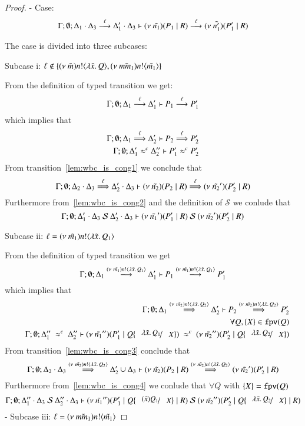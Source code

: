 \begin{proof}

	\noi - Case: 
	\[
		\horel{\Gamma}{\Delta_1 \cat \Delta_3}{\newsp{\tilde{n_1}}{P_1 \Par R}}{\by{\ell}}{\Delta_1' \cat \Delta_3}{\newsp{\tilde{n_1'}}{P_1' \Par R}}
	\]

	\noi The case is divided into three subcases:

	\noi Subcase i: $\ell \notin \set{\news{\tilde{m}} \bactout{n}{\abs{\tilde{x}}{Q}}, \news{\tilde{mm_1}} \bactout{n}{\tilde{m_1}}}$

	\noi From the definition of typed transition we get:
	\[
		\horel{\Gamma}{\Delta_1}{P_1}{\by{\ell}}{\Delta_1'}{P_1'}
	\]
	\noi which implies that
%
	\begin{eqnarray}
		\horel{\Gamma}{\Delta_1}{P_2}{\By{\ell}}{\Delta_2'}{P_2'}
		\label{lem:wbc_is_cong1}\\
		\horel{\Gamma}{\Delta_1'}{P_1'}{\wbc}{\Delta_2''}{P_2'}
		\label{lem:wbc_is_cong2}
	\end{eqnarray}
%
	\noi From transition~\ref{lem:wbc_is_cong1} we conclude that 
	\[
		\horel{\Gamma}{\Delta_2 \cat \Delta_3}{\newsp{\tilde{n_2}}{P_2 \Par R}}{\By{\ell}}{\Delta_2' \cat \Delta_3}{\newsp{\tilde{n_2}'}{P_2' \Par R}}
	\]
%
	\noi Furthermore from~\ref{lem:wbc_is_cong2} and the definition of $\mathcal{S}$ we conlude that
	\[
		\horel{\Gamma}{\Delta_1' \cat \Delta_3}{\newsp{\tilde{n_1}'}{P_1' \Par R}}{\ \mathcal{S}\ }{\Delta_2' \cat \Delta_3}{\newsp{\tilde{n_2}'}{P_2' \Par R}}
	\]

	\noi Subcase ii: $\ell = \news{\tilde{m_1}} \bactout{n}{\abs{\tilde{x}}{Q_1}}$

	\noi From the definition of typed transition we get
	\[
		\horel{\Gamma}{\Delta_1}{P_1}{\by{\news{\tilde{m_1}} \bactout{n}{\abs{\tilde{x}}{Q_1}}}}{\Delta_1'}{P_1'}
	\]
	\noi which implies that
%
	\begin{eqnarray}
		&& \horel{\Gamma}{\Delta_1}{P_2}{\By{\news{\tilde{m_2}} \bactout{n}{\abs{\tilde{x}}{Q_2}}}}{\Delta_2'}{P_2'}
		\label{lem:wbc_is_cong3} \\
		&&\forall Q, \set{X} \in \fpv{Q} \nonumber \\
		&& \horel{\Gamma}{\Delta_1''}{\newsp{\tilde{n_1}''}{P_1' \Par Q \subst{\abs{\tilde{x}}{Q_1}}{X}}}
		{\ \wbc\ }
		{\Delta_2''}{\newsp{\tilde{n_2}''}{P_2' \Par Q \subst{\abs{\tilde{x}}{Q_2}}{X}}}
		\label{lem:wbc_is_cong4}
	\end{eqnarray}
%
	\noi From transition~\ref{lem:wbc_is_cong3} conclude that 
	\[
		\horel{\Gamma}{\Delta_2 \cat \Delta_3}{\newsp{\tilde{n_2}}{P_2 \Par R}}{\By{\news{\tilde{m_2}} \bactout{n}{\abs{\tilde{x}}{Q_2}}}}{\Delta_2' \cup \Delta_3}{\newsp{\tilde{n_2}'}{P_2' \Par R}}
	\]
%
	\noi Furthermore from~\ref{lem:wbc_is_cong4} we conlude that $\forall Q$ with $\set{X} = \fpv{Q}$
%
	\[
		\horel{\Gamma}{\Delta_1'' \cat \Delta_3}{\newsp{\tilde{n_1}''}{P_1' \Par Q \subst{(\tilde{x}) Q_1}{X} \Par R}}{\ \mathcal{S}\ }{\Delta_2'' \cat \Delta_3}{\newsp{\tilde{n_2}''}{P_2' \Par Q \subst{\abs{\tilde{x}}{Q_2}}{X} \Par R}}
	\]
%
	- Subcase iii: $\ell = \news{\tilde{mm_1}} \bactout{n}{\tilde{m_1}}$


\end{proof}

